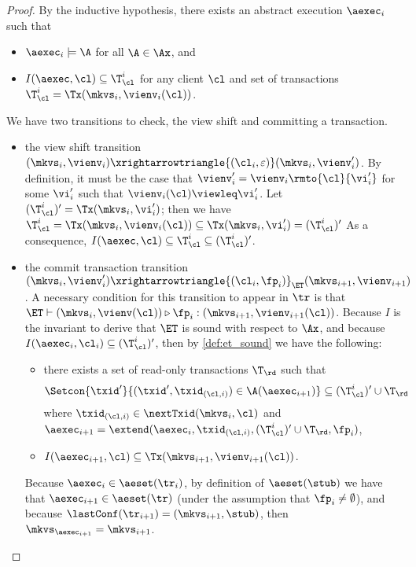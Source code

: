 \begin{proof}
By the inductive hypothesis, there exists an abstract execution $\aexec_i$ such that  
\begin{itemize}
\item $\aexec_{i} \models \A$ for all $\A \in \Ax$, and 
\item $I(\aexec, \cl) \subseteq \T_{\cl}^{i}$ for any client $\cl$ and set of transactions $\T_{\cl}^{i} = \Tx(\mkvs_{i}, \vienv_{i}(\cl))$.
\end{itemize}

We have two transitions to check, the view shift and committing a transaction.
\begin{itemize}
\item the view shift transition $(\mkvs_{i}, \vienv_{i}) \xrightarrowtriangle{(\cl_{i}, \varepsilon)} (\mkvs_{i}, \vienv'_{i})$. 
By definition, it must be the case that $\vienv'_{i} = \vienv_{i}\rmto{\cl}{\vi'_{i}}$ 
for some $\vi'_{i}$ such that $\vienv_{i}(\cl) \viewleq \vi'_{i}$.
Let $(\T_{\cl}^{i})' = \Tx(\mkvs_{i}, \vi'_{i})$; then we have 
\(
\T_{\cl}^{i} = \Tx(\mkvs_{i}, \vienv_{i}(\cl)) \subseteq \Tx(\mkvs_{i}, \vi'_{i}) = (\T_{\cl}^{i})'
\)
As a consequence, $I(\aexec, \cl) \subseteq \T_{\cl}^{i} \subseteq (\T_{\cl}^{i})'$.

\item the commit transaction transition $(\mkvs_{i}, \vienv_{i}') \xrightarrowtriangle{(\cl_{i}, \fp_{i})}_{\ET} 
(\mkvs_{i+1}, \vienv_{i+1})$.
A necessary condition for this transition 
to appear in $\tr$ is that $\ET \vdash (\mkvs_{i}, \vienv(\cl)) \triangleright \fp_{i}: (\mkvs_{i+1},\vienv_{i+1}(\cl))$. 
Because $I$ is the invariant to derive that $\ET$ is sound with respect to $\Ax$, 
and because $I(\aexec_{i}, \cl_{i}) \subseteq (\T^{i}_{\cl})'$, 
then by \cref{def:et_sound} we have the following:
\begin{itemize}
\item there exists a set of read-only transactions $\T_\rd$ 
    such that 
    \[
        \Setcon{\txid' }{ (\txid', \txid_{(\cl, i)}) \in \A(\aexec_{i+1})} \subseteq (\T^{i}_{\cl})' \cup \T_\rd
    \]
where 
$\txid_{(\cl, i)} \in \nextTxid(\mkvs_{i}, \cl)$
and $\aexec_{i+1} = \extend(\aexec_{i}, \txid_{(\cl, i)}, (\T^{i}_{\cl})' \cup \T_\rd, \fp_{i})$,
\item  $I(\aexec_{i+1}, \cl) \subseteq \Tx(\mkvs_{i+1}, \vienv_{i+1}(\cl))$.
\end{itemize} 
Because $\aexec_{i} \in \aeset(\tr_{i})$, by definition of $\aeset(\stub)$ we have that 
$\aexec_{i+1} \in \aeset(\tr)$ (under the assumption that $\fp_{i} \neq \emptyset$), 
and because $\lastConf(\tr_{i+1}) = (\mkvs_{i+1}, \stub)$, then $\mkvs_{\aexec_{i+1}} = \mkvs_{i+1}$. 


\end{itemize}
\end{proof}

